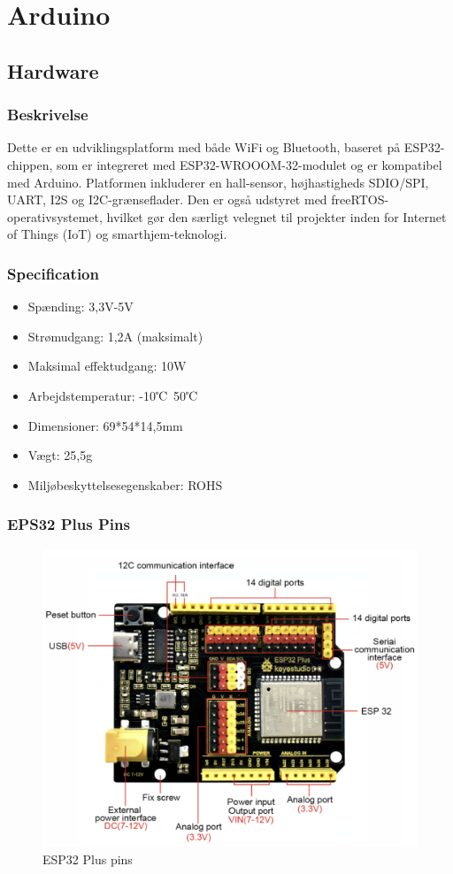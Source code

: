 \part{Arduino}
\chapter{Hardware}
\section{Beskrivelse}
Dette er en udviklingsplatform med både WiFi og Bluetooth, baseret på ESP32-chippen, som er integreret med ESP32-WROOOM-32-modulet og er kompatibel med Arduino. Platformen inkluderer en hall-sensor, højhastigheds SDIO/SPI, UART, I2S og I2C-grænseflader. Den er også udstyret med freeRTOS-operativsystemet, hvilket gør den særligt velegnet til projekter inden for Internet of Things (IoT) og smarthjem-teknologi.

\section{Specification}
\begin{itemize}
	\item Spænding: 3,3V-5V
	\item Strømudgang: 1,2A (maksimalt)
	\item Maksimal effektudgang: 10W
	\item Arbejdstemperatur: -10℃~50℃
	\item Dimensioner: 69*54*14,5mm
	\item Vægt: 25,5g
	\item Miljøbeskyttelsesegenskaber: ROHS
\end{itemize}
\clearpage
\section{EPS32 Plus Pins}
\begin{figure}[!h]
	\centering
	\includegraphics[width=\textwidth]{fig/fig22.png}
	\caption{ESP32 Plus pins}
\end{figure}
\clearpage
